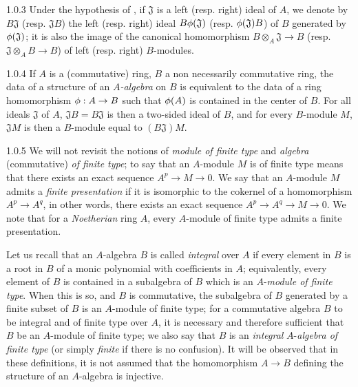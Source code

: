\begin{env}{1.0.3}
\label{env-0.1.0.3}
Under the hypothesis of , if $\mathfrak{J}$ is a left (resp. right) ideal of
$A$, we denote by $B\mathfrak{J}$ (resp. $\mathfrak{J}B$) the left (resp. right) ideal
$B\phi(\mathfrak{J})$ (resp. $\phi(\mathfrak{J})B$) of $B$ generated by
$\phi(\mathfrak{J})$; it is also the image of the canonical homomorphism
$B\otimes_A\mathfrak{J}\to B$ (resp. $\mathfrak{J}\otimes_A B\to B$) of left (resp. right)
$B$-modules.
\end{env}

\begin{env}{1.0.4}
\label{env-0.1.0.4}
If $A$ is a (commutative) ring, $B$ a non necessarily commutative ring, the data of
a structure of an \emph{$A$-algebra} on $B$ is equivalent to the data of a ring
homomorphism $\phi:A\to B$ such that $\phi(A)$ is contained in the center of $B$.
For all ideals $\mathfrak{J}$ of $A$, $\mathfrak{J}B=B\mathfrak{J}$ is then a two-sided ideal
of $B$, and for every $B$-module $M$, $\mathfrak{J}M$ is then a $B$-module equal to
$(B\mathfrak{J})M$.
\end{env}

\begin{env}{1.0.5}
\label{env-0.1.0.5}
We will not revisit the notions of \emph{module of finite type} and \emph{algebra}
(commutative) \emph{of finite type}; to say that an $A$-module $M$ is of finite type means
that there exists
an exact sequence $A^p\to M\to 0$. We say that an $A$-module $M$ admits a \emph{finite
presentation} if it is isomorphic to the cokernel of a homomorphism $A^p\to A^q$, in other
words, there exists an exact sequence $A^p\to A^q\to M\to 0$. We note that for a
\emph{Noetherian} ring $A$, every $A$-module of finite type admits a finite presentation.

Let us recall that an $A$-algebra $B$ is called \emph{integral} over $A$ if every element
in $B$ is a root in $B$ of a monic polynomial with coefficients in $A$; equivalently, every
element of $B$ is contained in a subalgebra of $B$ which is an $A$-\emph{module of finite
type}. When this is so, and $B$ is commutative, the subalgebra of $B$ generated by a finite
subset of $B$ is an $A$-module of finite type; for a commutative algebra $B$ to be integral
and of finite type over $A$, it is necessary and therefore sufficient that $B$ be an
$A$-module of finite type; we also say that $B$ is an \emph{integral} $A$-\emph{algebra of
finite type} (or simply \emph{finite} if there is no confusion). It will be observed that in
these definitions, it is not assumed that the homomorphism $A\to B$ defining the structure of
an $A$-algebra is injective.
\end{env}

